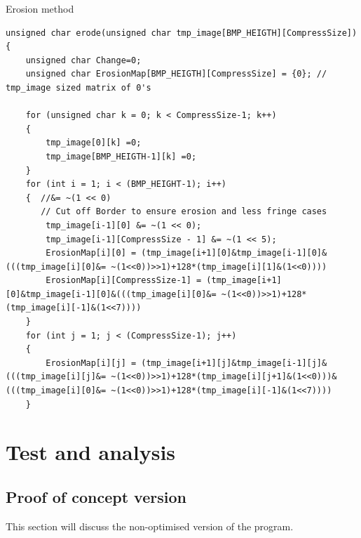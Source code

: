\documentclass[a4paper, english]{article}
\numberwithin{equation}{section}
\begin{document}
\begin{listing}[H]
\caption{Erosion method}\label{lst:erosion}
    \begin{verbatim}
unsigned char erode(unsigned char tmp_image[BMP_HEIGTH][CompressSize])
{
	unsigned char Change=0;
    unsigned char ErosionMap[BMP_HEIGTH][CompressSize] = {0}; // tmp_image sized matrix of 0's
   
    for (unsigned char k = 0; k < CompressSize-1; k++)
    {
		tmp_image[0][k] =0;
        tmp_image[BMP_HEIGTH-1][k] =0;
    }    
    for (int i = 1; i < (BMP_HEIGHT-1); i++) 
    {  //&= ~(1 << 0)
	   // Cut off Border to ensure erosion and less fringe cases
        tmp_image[i-1][0] &= ~(1 << 0);
        tmp_image[i-1][CompressSize - 1] &= ~(1 << 5);		
        ErosionMap[i][0] = (tmp_image[i+1][0]&tmp_image[i-1][0]&(((tmp_image[i][0]&= ~(1<<0))>>1)+128*(tmp_image[i][1]&(1<<0))))
		ErosionMap[i][CompressSize-1] = (tmp_image[i+1][0]&tmp_image[i-1][0]&(((tmp_image[i][0]&= ~(1<<0))>>1)+128*(tmp_image[i][-1]&(1<<7))))
	}
    for (int j = 1; j < (CompressSize-1); j++)
    {
		ErosionMap[i][j] = (tmp_image[i+1][j]&tmp_image[i-1][j]&(((tmp_image[i][j]&= ~(1<<0))>>1)+128*(tmp_image[i][j+1]&(1<<0)))&(((tmp_image[i][0]&= ~(1<<0))>>1)+128*(tmp_image[i][-1]&(1<<7))))   
    }
\end{verbatim}
\end{listing}
\section{Test and analysis}
\subsection{Proof of concept version}\label{sec:poctest}
This section will discuss the non-optimised version of the program.
\end{document}
